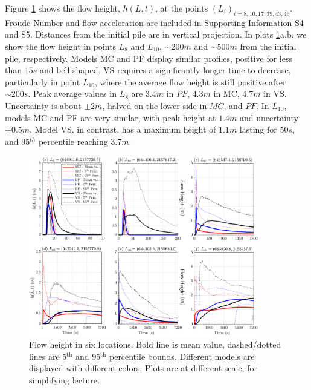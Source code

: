 \documentclass{article}
\begin{document}
Figure \ref{fig:Colima-H} shows the flow height, $h(L,t)$, at the points $(L_i)_{i=8,10,17,39,43,46}$. Froude Number and flow acceleration are included in Supporting Information S4 and S5. Distances from the initial pile are in vertical projection. In plots \ref{fig:Colima-H}a,b, we show the flow height in points $L_8$ and $L_{10}$, $\sim 200 m$ and $\sim 500 m$ from the initial pile, respectively. Models MC and PF display similar profiles, positive for less than $15 s$ and bell-shaped. VS requires a significantly longer time to decrease, particularly in point $L_{10}$, where the average flow height is still positive after $\sim 200 s$. Peak average values in $L_8$ are $3.4 m$ in $PF$, $4.3 m$ in MC, $4.7 m$ in VS. Uncertainty is about $\pm 2 m$, halved on the lower side in $MC$, and $PF$. In $L_{10}$, models MC and PF are very similar, with peak height at $1.4 m$ and uncertainty $\pm 0.5 m$. Model VS, in contrast, has a maximum height of $1.1 m$ lasting for $50s$, and 95$^{th}$ percentile reaching $3.7 m$.
\begin{figure}[H]
         \centering
        \includegraphics[width=0.9\textwidth]{figures/Colima/Height.png}
        \caption{Flow height in six locations. Bold line is mean value, dashed/dotted lines are 5$^{\mathrm{th}}$ and 95$^{\mathrm{th}}$ percentile bounds. Different models are displayed with different colors. Plots are at different scale, for simplifying lecture.}
        \label{fig:Colima-H}
\end{figure}
\end{document}
